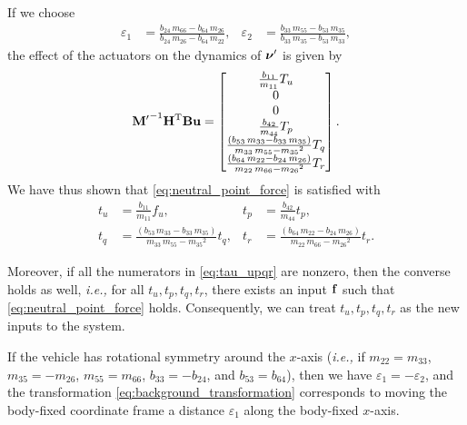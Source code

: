 If we choose
\begin{align}
    \varepsilon_1 &= \frac{b_{24}\,m_{66}-b_{64}\,m_{26}}{b_{24}\,m_{26}-b_{64}\,m_{22}}, &
    \varepsilon_2 &= \frac{b_{33}\,m_{55}-b_{53}\,m_{35}}{b_{33}\,m_{35}-b_{53}\,m_{33}},
\end{align}
the effect of the actuators on the dynamics of $\bm{\nu}^{\prime}$ is given by
\begin{equation}
    {\mathbf{M}^{\prime}}^{-1}\mathbf{H}^{\mathrm{T}}\mathbf{B}\mathbf{u} =
    \begin{bmatrix}
        \frac{b_{11}}{m_{11}} T_{u} \\
        0 \\ 
        0 \\ 
        \frac{b_{42}}{m_{44}} T_{p} \\ 
        \frac{\left(b_{53}\,m_{33}-b_{33}\,m_{35}\right)}{m_{33}\,m_{55}-{m_{35}}^2} T_{q} \\ 
        \frac{\left(b_{64}\,m_{22}-b_{24}\,m_{26}\right)}{m_{22}\,m_{66}-{m_{26}}^2} T_{r}
    \end{bmatrix}.
\end{equation}
We have thus shown that \eqref{eq:neutral_point_force} is satisfied with
\begin{subequations}
    \begin{align}
        t_u &= \frac{b_{11}}{m_{11}} f_{u}, &
        t_p &= \frac{b_{42}}{m_{44}} t_{p}, \\
        t_q &= \frac{\left(b_{53}\,m_{33}-b_{33}\,m_{35}\right)}{m_{33}\,m_{55}-{m_{35}}^2} t_{q}, &
        t_r &= \frac{\left(b_{64}\,m_{22}-b_{24}\,m_{26}\right)}{m_{22}\,m_{66}-{m_{26}}^2} t_{r}.
    \end{align} 
    \label{eq:tau_upqr}
\end{subequations}

\noindent Moreover, if all the numerators in \eqref{eq:tau_upqr} are nonzero, then the converse holds as well, \emph{i.e.,} for all $t_u, t_p, t_q, t_r$, there exists an input $\mathbf{f}$ such that \eqref{eq:neutral_point_force} holds.
Consequently, we can treat $t_u, t_p, t_q, t_r$ as the new inputs to the system.

\begin{rmk*}
    If the vehicle has rotational symmetry around the $x$-axis (\emph{i.e.,} if $m_{22} = m_{33}$, $m_{35} = -m_{26}$, $m_{55} = m_{66}$, $b_{33} = -b_{24}$, and $b_{53} = b_{64}$), then we have $\varepsilon_1 = -\varepsilon_2$, and the transformation \eqref{eq:background_transformation} corresponds to moving the body-fixed coordinate frame a distance $\varepsilon_1$ along the body-fixed $x$-axis.
\end{rmk*}

